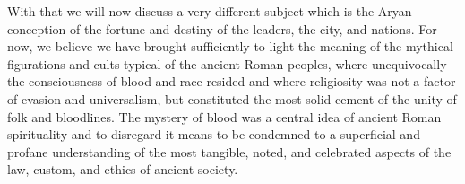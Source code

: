 With that we will now discuss a very different subject which is the Aryan conception of the fortune and destiny of the leaders, the city, and nations. For now, we believe we have brought sufficiently to light the meaning of the mythical figurations and cults typical of the ancient Roman peoples, where unequivocally the consciousness of blood and race resided and where religiosity was not a factor of evasion and universalism, but constituted the most solid cement of the unity of folk and bloodlines. The mystery of blood was a central idea of ancient Roman spirituality and to disregard it means to be condemned to a superficial and profane understanding of the most tangible, noted, and celebrated aspects of the law, custom, and ethics of ancient society.




